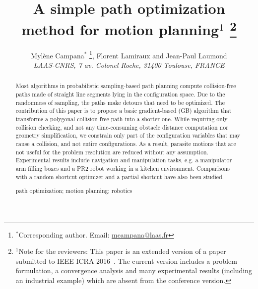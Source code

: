 \documentclass{tADR2e}
\begin{document}
\graphicspath{{images/}}



\title{A simple path optimization method for motion planning$^{1}$ \thanks{$^{1}$Note for the reviewers: 
This paper is an extended version of a paper submitted to IEEE ICRA 2016~\cite{pathOptimICRA_HAL}. The 
current version includes a problem formulation, a convergence analysis and many experimental results (including an 
industrial example) which are absent from the conference version.}}	

\author{Myl\`{e}ne Campana$^{\ast}$ \thanks{$^\ast$Corresponding author. Email: \href{mailto:mcampana@laas.fr}{mcampana@laas.fr}}, Florent Lamiraux and Jean-Paul Laumond
\\\vspace{6pt}
{\em{LAAS-CNRS, 7 av. Colonel Roche, 31400 Toulouse, FRANCE}}
}
\maketitle



\begin{abstract}
Most algorithms in probabilistic sampling-based path planning compute 
collision-free paths made of straight line segments lying in the configuration 
space. Due
to the randomness of sampling, the paths make detours that need to be optimized.
The contribution of this paper is to propose a basic gradient-based (GB) algorithm 
that transforms a polygonal collision-free path into a shorter one.
While requiring only collision 
checking, and not any time-consuming obstacle distance computation nor geometry 
simplification, we constrain only part of the configuration variables 
that may cause a collision, and not entire configurations. As a result, parasite motions that are not useful for the problem resolution are reduced without any 
assumption.
Experimental results include navigation and manipulation tasks, 
e.g. a manipulator arm filling boxes and a PR2 robot working in a kitchen 
environment. Comparisons with a random shortcut optimizer and a partial 
shortcut have also been studied.


\medskip

\begin{keywords}path optimization; motion planning; robotics
\end{keywords}\medskip

\end{abstract}
\end{document}
